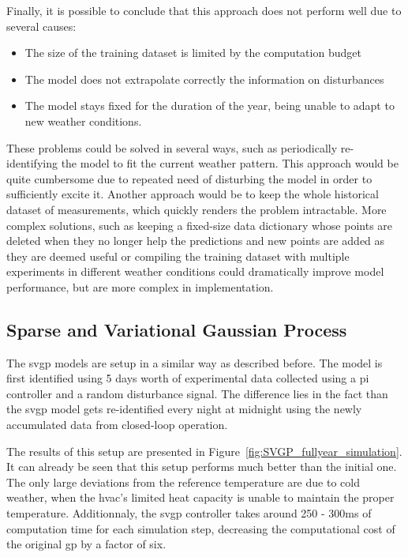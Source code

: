 Finally, it is possible to conclude that this approach does not perform well due
to several causes:

\begin{itemize}
    \item The size of the training dataset is limited by the computation budget
    \item The model does not extrapolate correctly the information on
        disturbances
    \item The model stays fixed for the duration of the year, being unable to
        adapt to new weather conditions.
\end{itemize}

These problems could be solved in several ways, such as periodically
re-identifying the model to fit the current weather pattern. This approach would
be quite cumbersome due to repeated need of disturbing the model in order to
sufficiently excite it. Another approach would be to keep the whole historical
dataset of measurements, which quickly renders the problem intractable. More
complex solutions, such as keeping a fixed-size data dictionary whose points are
deleted when they no longer help the predictions and new points are added as
they are deemed useful or compiling the training dataset with multiple
experiments in different weather conditions could dramatically improve model
performance, but are more complex in implementation.


\subsection{Sparse and Variational Gaussian Process}\label{sec:SVGP_results}

The \acrshort{svgp} models are setup in a similar way as described before. The
model is first identified using 5 days worth of experimental data collected
using a \acrshort{pi} controller and a random disturbance signal. The difference
lies in the fact than the \acrshort{svgp} model gets re-identified every night
at midnight using the newly accumulated data from closed-loop operation.

The results of this setup are presented in
Figure~\ref{fig:SVGP_fullyear_simulation}. It can already be seen that this
setup performs much better than the initial one. The only large deviations from
the reference temperature are due to cold weather, when the \acrshort{hvac}'s
limited heat capacity is unable to maintain the proper temperature.
Additionnaly, the \acrshort{svgp} controller takes around 250 - 300ms of
computation time for each simulation step, decreasing the computational cost of
the original \acrshort{gp} by a factor of six.



